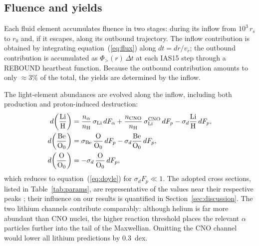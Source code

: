 \documentclass[twocolumn,showpacs,preprintnumbers,amsmath,amssymb]{revtex4}
\begin{document}
\subsection{Fluence and yields}

Each fluid element accumulates fluence in two stages: during its inflow from $10^3\,r_s$ to $r_0$ and, if it escapes, along its outbound trajectory. The inflow contribution is obtained by integrating equation~(\ref{eq:flux}) along $dt = dr/v_r$; the outbound contribution is accumulated as $\Phi_{>}(r)\,\Delta t$ at each IAS15 step through a REBOUND heartbeat function. Because the outbound contribution amounts to only $\approx3\%$ of the total, the yields are determined by the inflow.

The light-element abundances are evolved along the inflow, including both production and proton-induced destruction:
\begin{align}
\label{eq:yields}
d\!\left(\frac{\rm Li}{\rm H}\right) &= \frac{n_\alpha}{n_{\rm H}}\,\sigma_{\rm Li}\, dF_\alpha + \frac{n_{\rm CNO}}{n_{\rm H}}\,\sigma_{\rm Li}^{\rm CNO}\, dF_p - \sigma_d \frac{\rm Li}{\rm H}\, dF_p , \nonumber\\
d\!\left(\frac{\rm Be}{\rm O_0}\right) &= \sigma_{\rm Be}\,\frac{\rm O}{\rm O_0}\, dF_p - \sigma_d \frac{\rm Be}{\rm O_0}\, dF_p , \\
d\!\left(\frac{\rm O}{\rm O_0}\right) &= -\sigma_d\, \frac{\rm O}{\rm O_0}\, dF_p , \nonumber
\end{align}
which reduces to equation~(\ref{eq:doyle}) for $\sigma_d F_p\ll 1$. The adopted cross sections, listed in Table~\ref{tab:params}, are representative of the values near their respective peaks \cite{ReadViola1984,Doyle_2021}; their influence on our results is quantified in Section~\ref{sec:discussion}. The two lithium channels contribute comparably: although helium is far more abundant than CNO nuclei, the higher reaction threshold places the relevant $\alpha$ particles further into the tail of the Maxwellian. Omitting the CNO channel would lower all lithium predictions by 0.3~dex.
\end{document}
